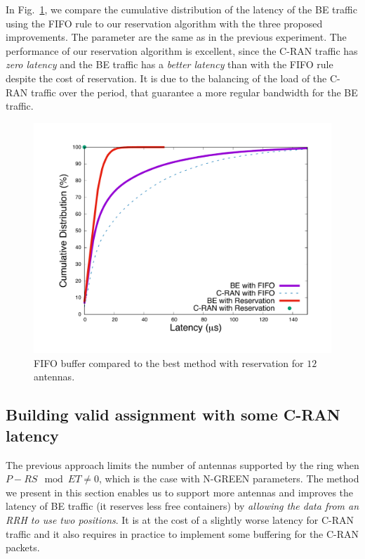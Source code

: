 \documentclass[10pt, conference, letterpaper]{IEEEtran}
\begin{document}
In Fig.~\ref{fig:optimres}, we compare the cumulative distribution of the latency of the BE traffic using the FIFO rule to our reservation algorithm with the three proposed improvements. The parameter are the same as in the previous experiment. The performance of our reservation algorithm is excellent, since the C-RAN traffic has \emph{zero latency} and the BE traffic has a \emph{better latency} than with the FIFO rule despite the cost of reservation. It is due to the balancing of the load of the C-RAN traffic over the period, that guarantee a more regular bandwidth for the BE traffic.
  

  \begin{figure}[h!]
\begin{center}   
     \includegraphics[scale=0.25]{optim.pdf}
     \caption{FIFO buffer compared to the best method with reservation for $12$ antennas.} \label{fig:optimres}
\end{center}
  \end{figure}
      
     
\subsection{Building valid assignment with some C-RAN latency}
\label{sec:maxant}

The previous approach limits the number of antennas supported by the ring when $P-RS \mod ET \neq 0$, which is the case with N-GREEN parameters. The method we present in this section enables us to support more antennas and improves the latency of BE traffic (it reserves less free containers) by \emph{allowing the data from an RRH to use two positions}.
It is at the cost of a slightly worse latency for C-RAN traffic and it also requires in practice to implement some buffering for the C-RAN packets. 
\end{document}
